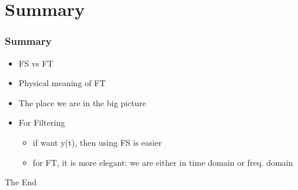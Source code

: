 \documentclass{beamer}
\begin{document}
\section{Summary}
\begin{frame}
    \frametitle{Summary}
    \begin{itemize}
        \item FS vs FT
        \item Physical meaning of FT
        \item The place we are in the big picture
        \item For Filtering
        \begin{itemize}
            \item if want y(t), then using FS is easier
            \item for FT, it is more elegant: we are either in time domain or freq. domain
        \end{itemize}
    \end{itemize}
\end{frame}


\begin{frame}
\Huge{\centerline{The End}}
\end{frame}

\end{document}
